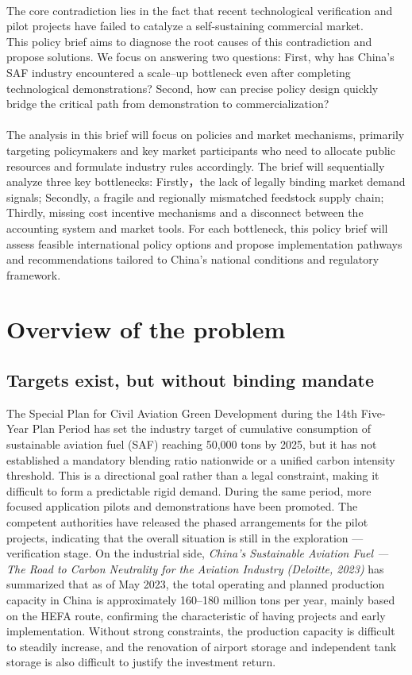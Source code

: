 \documentclass[a4paper,11pt]{article}
\begin{document}
\\
The core contradiction lies in the fact that recent technological verification and pilot projects have failed to catalyze a self-sustaining commercial market.
\\
This policy brief aims to diagnose the root causes of this contradiction and propose solutions. We focus on answering two questions: First, why has China's SAF industry encountered a scale--up bottleneck even after completing technological demonstrations? Second, how can precise policy design quickly bridge the critical path from demonstration to commercialization?\\
\\
The analysis in this brief will focus on policies and market mechanisms, primarily targeting policymakers and key market participants who need to allocate public resources and formulate industry rules accordingly. The brief will sequentially analyze three key bottlenecks: Firstly，the lack of legally binding market demand signals; Secondly, a fragile and regionally mismatched feedstock supply chain; Thirdly, missing cost incentive mechanisms and a disconnect between the accounting system and market tools. For each bottleneck, this policy brief will assess feasible international policy options and propose implementation pathways and recommendations tailored to China's national conditions and regulatory framework.



\section{Overview of the problem}
\subsection{Targets exist, but without binding mandate}
The Special Plan for Civil Aviation Green Development during the 14th Five-Year Plan Period has set the industry target of cumulative consumption of sustainable aviation fuel (SAF) reaching 50,000 tons by 2025, but it has not established a mandatory blending ratio nationwide or a unified carbon intensity threshold. This is a directional goal rather than a legal constraint, making it difficult to form a predictable rigid demand. During the same period, more focused application pilots and demonstrations have been promoted. The competent authorities have released the phased arrangements for the pilot projects, indicating that the overall situation is still in the exploration --- verification stage. On the industrial side, \textit{China's Sustainable Aviation Fuel --- The Road to Carbon Neutrality for the Aviation Industry (Deloitte, 2023) }has summarized that as of May 2023, the total operating and planned production capacity in China is approximately 160--180 million tons per year, mainly based on the HEFA route, confirming the characteristic of having projects and early implementation. Without strong constraints, the production capacity is difficult to steadily increase, and the renovation of airport storage and independent tank storage is also difficult to justify the investment return.
\end{document}
